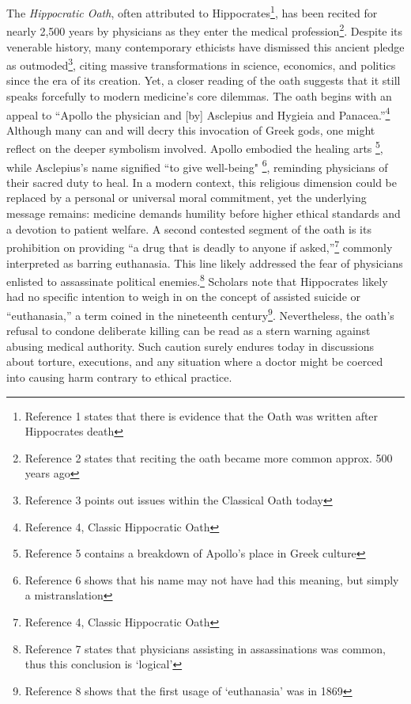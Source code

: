\documentclass[12pt]{article}
\begin{document}
The \textit{Hippocratic Oath}, often attributed to Hippocrates\footnote{Reference 1 states that there is evidence that the Oath was written after Hippocrates death},
has been recited for nearly 2,500 years by physicians as they enter the medical profession\footnote{Reference 2 states that reciting the oath became more common approx. 500 years ago}. 
Despite its venerable history, many contemporary ethicists have dismissed this ancient pledge as outmoded\footnote{Reference 3 points out issues within the Classical Oath today}, 
citing massive transformations in science, economics, and politics since the era of its creation. 
Yet, a closer reading of the oath suggests that it still speaks forcefully to modern medicine’s core dilemmas. 
The oath begins with an appeal to “Apollo the physician and [by] Asclepius and Hygieia and Panacea.”\footnote{Reference 4, Classic Hippocratic Oath}
Although many can and will decry this invocation of Greek gods, one might reflect on the deeper symbolism involved. Apollo embodied the healing arts
\footnote{Reference 5 contains a breakdown of Apollo's place in Greek culture}, while Asclepius’s name signified ``to give well-being"
\footnote{Reference 6 shows that his name may not have had this meaning, but simply a mistranslation}, reminding physicians of their sacred duty to 
heal. In a modern context, this religious dimension could be replaced by a personal or universal moral commitment, yet the underlying message remains: 
medicine demands humility before higher ethical standards and a devotion to patient welfare. A second contested segment of the oath is its prohibition 
on providing “a drug that is deadly to anyone if asked,”\footnote{Reference 4, Classic Hippocratic Oath} commonly interpreted as barring euthanasia. 
This line likely addressed the fear of physicians enlisted to assassinate political enemies.\footnote{Reference 7 states that physicians 
assisting in assassinations was common, thus this conclusion is `logical'} Scholars note that Hippocrates likely had no specific intention to weigh in on 
the concept of assisted suicide or “euthanasia,” a term coined in the nineteenth century\footnote{Reference 8 shows that the first usage of 
`euthanasia' was in 1869}. Nevertheless, the oath’s refusal to condone deliberate killing can be read as a stern warning against abusing medical 
authority. Such caution surely endures today in discussions about torture, executions, and 
any situation where a doctor might be coerced into causing harm contrary to ethical practice.

\bigskip
\end{document}
